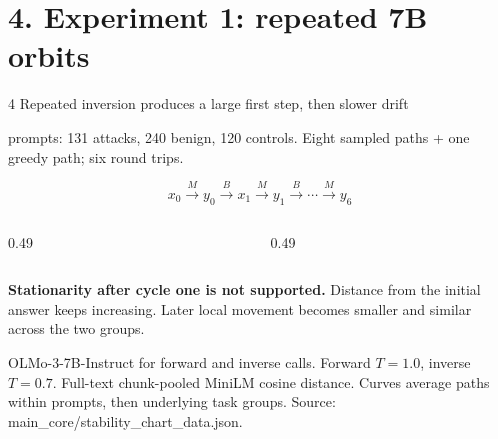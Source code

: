\documentclass[aspectratio=169,10pt]{beamer}
\renewcommand{\small}{\fontsize{17}{22}\selectfont}
\newcommand{\sources}[1]{{\fontsize{10.5}{13}\selectfont\color{Muted}#1\par}}
\begin{document}
\section{4. Experiment 1: repeated 7B orbits}
\begin{frame}{4 \quad Repeated inversion produces a large first step, then slower drift}
 \par{\small 491 prompts: 131 attacks, 240 benign, 120 controls. Eight sampled paths + one greedy path; six round trips.\par}
 \[x_0\xrightarrow{M}y_0\xrightarrow{B}x_1\xrightarrow{M}y_1\xrightarrow{B}\cdots\xrightarrow{M}y_6\]
 \begin{columns}[T,onlytextwidth]
  \begin{column}{0.49\textwidth}\end{column}
  \begin{column}{0.49\textwidth}\end{column}
 \end{columns}
 \par\vspace{0.25cm}
 \textbf{Stationarity after cycle one is not supported.} Distance from the initial answer keeps increasing. Later local movement becomes smaller and similar across the two groups.
 \vfill
 \sources{OLMo-3-7B-Instruct for forward and inverse calls. Forward \(T=1.0\), inverse \(T=0.7\). Full-text chunk-pooled MiniLM cosine distance. Curves average paths within prompts, then underlying task groups. Source: main\_core/stability\_chart\_data.json.}
\end{frame}
\end{document}
